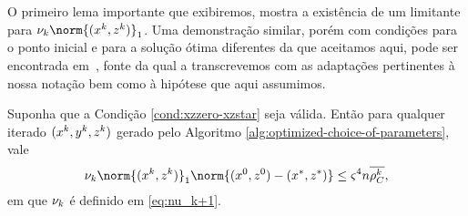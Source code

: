 
O primeiro lema importante que exibiremos, mostra a existência de um limitante para $\nuk \norm{(\xk,\zk)}_{1}$. Uma demonstração similar, porém com condições para o ponto inicial e para a solução ótima diferentes da que aceitamos aqui, pode ser encontrada em~\cite[Lema 6.1]{Wright:Primal-dual-interior-point:1997h}, fonte da qual a transcrevemos com as adaptações pertinentes à nossa notação bem como à hipótese que aqui assumimos.




\begin{lema}\label{lemma:boundxz1}
	Suponha que  a Condição \ref{cond:xzzero-xzstar} seja válida. Então para qualquer iterado $(x^{k},y^{k},z^{k})$ gerado pelo Algoritmo \ref{alg:optimized-choice-of-parameters}, vale
	\begin{equation}
		\label{eq:bound-xkzk}
		\nuk \norm{(\xk,\zk)}_{1} \norm{(\xzero,\zzero) - (\xstar,\zstar)} \leq \bdxzstar^{4} n \rhoCkb ,
	\end{equation}
	em que $\nu_{k} $ é definido em \eqref{eq:nu_k+1}.
\end{lema}


